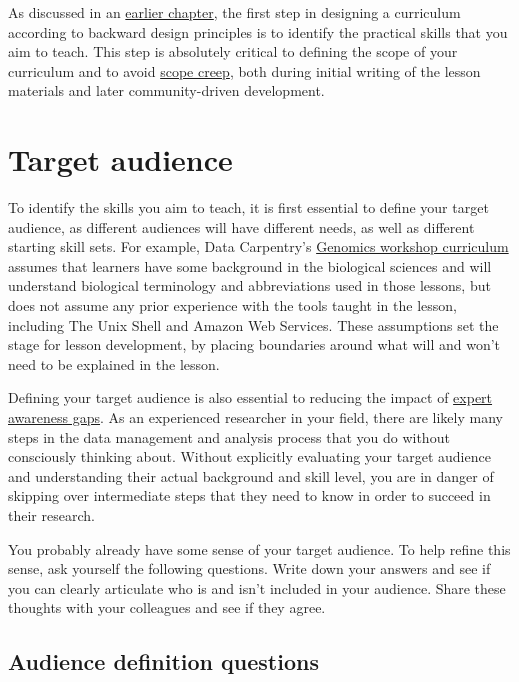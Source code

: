 \documentclass[
]{book}
\begin{document}
As discussed in an \protect\hyperlink{backward-design}{earlier chapter}, the first step in designing a curriculum according to backward design principles is to
identify the practical skills that you aim to teach. This step is absolutely critical to defining the scope of
your curriculum and to avoid \href{https://en.wikipedia.org/wiki/Scope_creep}{scope creep}, both during initial writing of the lesson materials and later
community-driven development.

\hypertarget{target-audience}{%
\section{Target audience}\label{target-audience}}

To identify the skills you aim to teach, it is first essential to define your
target audience, as different audiences will have different needs, as well as different starting skill sets. For
example, Data Carpentry's \href{https://datacarpentry.org/genomics-workshop/}{Genomics workshop curriculum} assumes
that learners have some background in the biological sciences and will understand biological terminology and
abbreviations used in those lessons, but does not assume any prior experience with the tools taught in the lesson,
including The Unix Shell and Amazon Web Services. These assumptions set the stage for lesson development, by
placing boundaries around what will and won't need to be explained in the lesson.

Defining your target audience is also essential to reducing the impact of
\href{https://carpentries.github.io/instructor-training/03-expertise/index.html\#expertise-and-teaching}{expert awareness gaps}.
As an experienced researcher in your field, there are likely many steps in the data
management and analysis process that you do without consciously thinking about. Without
explicitly evaluating your target audience and understanding their actual background
and skill level, you are in danger of skipping over intermediate steps that they
need to know in order to succeed in their research.

You probably already have some sense of your target audience. To help refine this sense, ask yourself the
following questions. Write down your answers and see if you can clearly articulate who is and isn't included
in your audience. Share these thoughts with your colleagues and see if they agree.

\hypertarget{audience-definition-questions}{%
\subsection{Audience definition questions}\label{audience-definition-questions}}
\end{document}
